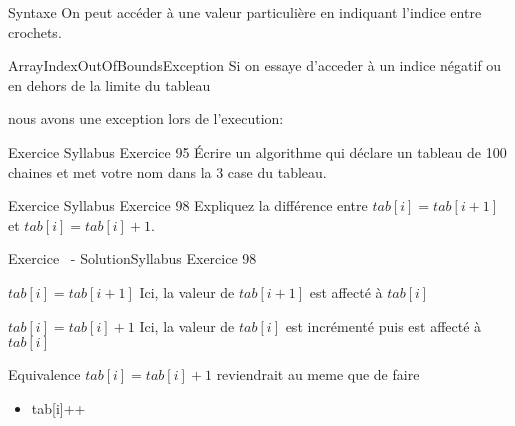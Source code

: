 \begin{frame}{Syntaxe}
    \pause
    On peut accéder à une valeur particulière en indiquant l'indice entre crochets.
    

    \pause
    \begin{alertblock}{ArrayIndexOutOfBoundsException}
        Si on essaye d'acceder à un indice négatif ou en dehors de la limite du tableau
        
        nous avons une exception lors de l'execution:
        
    \end{alertblock}

\end{frame}

\begin{frame}{Exercice \theexercice}{Syllabus Exercice 95}
    Écrire un algorithme qui déclare un tableau de 100 chaines
    et met votre nom dans la 3\ieme{} case du tableau.
\end{frame}

\begin{frame}{Exercice \theexercice}{Syllabus Exercice 98}
    Expliquez la différence entre $tab[i] = tab[i+1]$
    et $tab[i] = tab[i]+1$.
\end{frame}

\begin{frame}{Exercice \theexercice~- Solution}{Syllabus Exercice 98}
    \pause
    \begin{block}{\textbf{$tab[i] = tab[i+1]$}}
        Ici, la valeur de $tab[i+1]$ est affecté à $tab[i]$
    \end{block}

    \pause
    \begin{block}{\textbf{$tab[i] = tab[i]+1$}}
        Ici, la valeur de $tab[i]$ est incrémenté puis est affecté à $tab[i]$
    \end{block}

    \pause
    \begin{exampleblock}{Equivalence}
        $tab[i] = tab[i]+1$ reviendrait au meme que de faire
        \begin{itemize}
            \item tab[i]++
        \end{itemize}
    \end{exampleblock}
\end{frame}